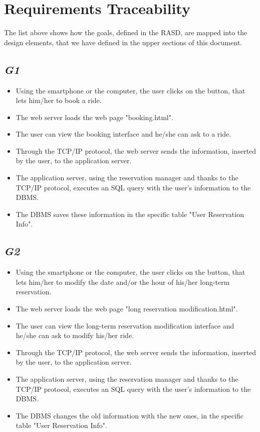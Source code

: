 \section{Requirements Traceability}
The list above shows how the goals, defined in the RASD, are mapped into the design elements, that we have defined in the upper sections of this document.
	\subsection {\emph{G1}}
		\begin{itemize}
			\item Using the smartphone or the computer, the user clicks on the button, that lets him/her to book a ride.
			\item The web server loads the web page "booking.html".
			\item The user can view the booking interface and he/she can ask to a ride.
			\item Through the TCP/IP protocol, the web server sends the information, inserted by the user, to the application server.
			\item The application server, using the reservation manager and thanks to the TCP/IP protocol, executes an SQL query with the user's information to the DBMS.
			\item The DBMS saves these information in the specific table "User Reservation Info".
		\end{itemize}
	\subsection {\emph{G2}}
		\begin{itemize}
			\item Using the smartphone or the computer, the user clicks on the button, that lets him/her to modify the date and/or the hour of his/her long-term reservation.
			\item The web server loads the web page "long reservation modification.html".
			\item The user can view the long-term reservation modification interface and he/she can ask to modify his/her ride.
			\item Through the TCP/IP protocol, the web server sends the information, inserted by the user, to the application server.
			\item The application server, using the reservation manager and thanks to the TCP/IP protocol, executes an SQL query with the user's information to the DBMS.
			\item The DBMS changes the old information with the new ones, in the specific table "User Reservation Info".
		\end{itemize}

